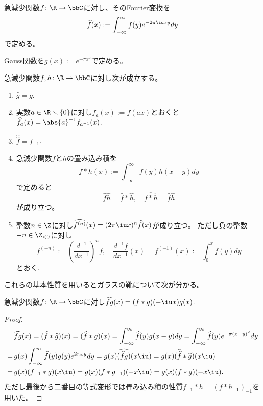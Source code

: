 \documentclass[11pt,b5paper,oneside,lualatex]{ltjsarticle} %
\renewcommand{\setminus}{\smallsetminus}
\numberwithin{equation}{section} %
\begin{document}
\begin{dfn}
	急減少関数$ f \colon \R \to \bbC $に対し、そのFourier変換を
	\[
	\widehat{f}(x) := \int_{-\infty}^{\infty} f(y) e^{-2\pi\iu xy} dy
	\]
	で定める。
\end{dfn}

\begin{nota}
	Gauss関数を$ g(x) := e^{-\pi x^2} $で定める。
\end{nota}

\begin{lem} \label{lem:Fourier}
	急減少関数$ f, h \colon \R \to \bbC $に対し次が成立する。
	\begin{enumerate}
		\item $ \widehat{g} = g $.
		\item 実数$ a \in \R \setminus \{ 0 \} $に対し$ f_a(x) := f(ax) $とおくと
		$ \widehat{f_a}(x) = \abs{a}^{-1} f_{a^{-1}} (x) $.
		\item $ \widehat{\widehat{f}} = f_{-1} $.
		\item 急減少関数$ f $と$ h $の畳み込み積を
		\[
		f \ast h (x) := \int_{-\infty}^{\infty} f(y) h(x-y) dy
		\]
		で定めると
		\[
		\widehat{fh} = \widehat{f} \ast \widehat{h}, \quad
		\widehat{f \ast h} = \widehat{f} \widehat{h}
		\]
		 が成り立つ。
		 \item \label{item:lem:Fourier_diff}
		 整数$ n \in \Z $に対し$ \widehat{f^{(n)}} (x) = (2 \pi \iu x)^n \widehat{f}(x) $が成り立つ。
		 ただし負の整数$ -n \in \Z_{<0} $に対し
		 \[
		 f^{(-n)} := \left( \frac{d^{-1}}{dx^{-1}} \right)^n f, \quad
		 \frac{d^{-1} f}{dx^{-1}} (x) = f^{(-1)} (x) := \int_{0}^{x} f(y) dy
		 \]
		 とおく.
	\end{enumerate}
\end{lem}

これらの基本性質を用いるとガラスの靴について次が分かる。

\begin{lem}
	急減少関数$ f \colon \R \to \bbC $に対し$ \widehat{fg}(x) = (f \ast g)(-\iu x) g(x)  $.
\end{lem}

\begin{proof}
	\begin{align}
		&\widehat{fg}(x) 
		=
		(\widehat{f} \ast \widehat{g}) (x)
		=
		(\widehat{f} \ast g) (x)
		=
		\int_{-\infty}^{\infty} \widehat{f} (y) g(x-y) dy
		=
		\int_{-\infty}^{\infty} \widehat{f} (y) e^{-\pi (x-y)^2} dy
		\\
		= \,
		&g(x) \int_{-\infty}^{\infty} \widehat{f} (y) g(y) e^{2\pi xy} dy
		=
		g(x) \widehat{(\widehat{f} g)} (x \iu)
		=
		g(x) ( \widehat{\widehat{f}} \ast \widehat{g}) (x \iu)
		\\
		= \,
		&g(x) ( f_{-1} \ast g) (x \iu)
		=
		g(x) ( f \ast g_{-1}) (-x \iu)
		=
		g(x) ( f \ast g) (-x \iu).
	\end{align}
	ただし最後から二番目の等式変形では畳み込み積の性質$ f_{-1} \ast h =  (f \ast h_{-1})_{-1} $を用いた。
\end{proof}
\end{document}
